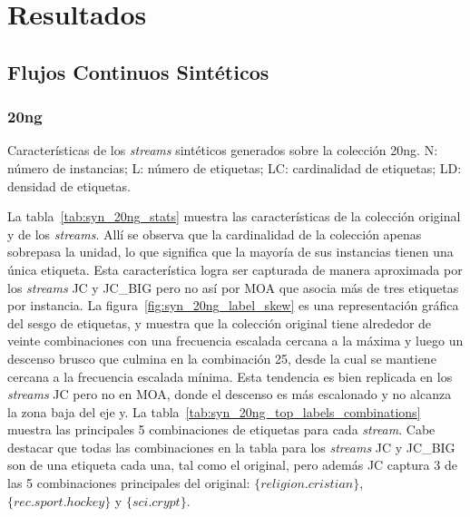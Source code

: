 \section{Resultados}

\subsection{Flujos Continuos Sintéticos}

\subsubsection{20ng}

\begin{table}[htbp]
	\centering
	\begin{adjustbox}{max width=\textwidth}
		
	\end{adjustbox}
	\caption[Características de los \textit{streams} sintéticos generados sobre
		la colección 20ng.]{Características de los \textit{streams} sintéticos generados sobre
		la colección 20ng.  N: número de instancias; L: número de etiquetas; LC:
		cardinalidad de etiquetas; LD: densidad de etiquetas.}
	\label{tab:syn_20ng_stats}
\end{table}

La tabla~\ref{tab:syn_20ng_stats} muestra las características de la colección
original y de los \textit{streams}. Allí se observa que la cardinalidad de la
colección apenas sobrepasa la unidad, lo que significa que la mayoría de sus
instancias tienen una única etiqueta. Esta característica logra ser capturada de
manera aproximada por los \textit{streams} JC y JC\_BIG pero no así por MOA que
asocia más de tres etiquetas por instancia. La
figura~\ref{fig:syn_20ng_label_skew} es una representación gráfica del sesgo de
etiquetas, y muestra que la colección original tiene alrededor de veinte
combinaciones con una frecuencia escalada cercana a la máxima y luego un
descenso brusco que culmina en la combinación 25, desde la cual se mantiene
cercana a la frecuencia escalada mínima. Esta tendencia es bien replicada en los
\textit{streams} JC pero no en MOA, donde el descenso es más escalonado y no
alcanza la zona baja del eje y. La
tabla~\ref{tab:syn_20ng_top_labels_combinations} muestra las principales 5
combinaciones de etiquetas para cada \textit{stream}. Cabe destacar que todas
las combinaciones en la tabla para los \textit{streams} JC y JC\_BIG son de una
etiqueta cada una, tal como el original, pero además JC captura 3 de las 5
combinaciones principales del original: $\{religion.cristian\}$,
$\{rec.sport.hockey\}$ y $\{sci.crypt\}$.

